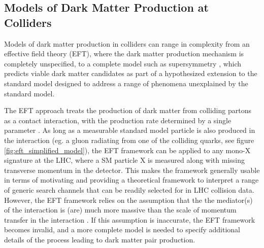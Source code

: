 \documentclass[12pt]{article}
\begin{document}
\subsection{Models of Dark Matter Production at Colliders}
Models of dark matter production in colliders can range in complexity from an effective field theory (EFT), where the dark matter production mechanism is completely unspecified, to a complete model such as supersymmetry \cite{susy_dm}, which predicts viable dark matter candidates as part of a hypothesized extension to the standard model designed to address a range of phenomena unexplained by the standard model. 

The EFT approach treats the production of dark matter from colliding partons as a contact interaction, with the production rate determined by a single parameter \cite{DM_colliders}. As long as a measurable standard model particle is also produced in the interaction (eg. a gluon radiating from one of the colliding quarks, see figure \ref{fig:eft_simplified_model}), the EFT framework can be applied to any mono-X signature at the LHC, where a SM particle X is measured along with missing transverse momentum in the detector. This makes the framework generally usable in terms of motivating and providing a theoretical framework to interpret a range of generic search channels that can be readily selected for in LHC collision data. However, the EFT framework relies on the assumption that the the mediator(s) of the interaction is (are) much more massive than the scale of momentum transfer in the interaction \cite{DM_colliders, beyond_eft}. If this assumption is inaccurate, the EFT framework becomes invalid, and a more complete model is needed to specify additional details of the process leading to dark matter pair production. 
\end{document}
